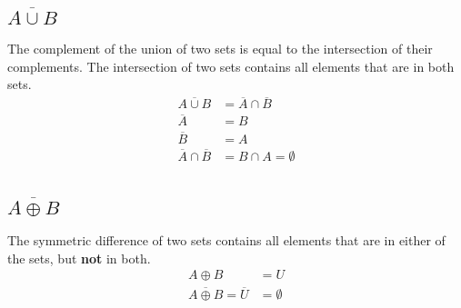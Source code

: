 \documentclass[a4paper,11pt]{scrartcl}
\begin{document}
\subsection{\(\overline{A \cup B}\)} The complement of the union of two sets is equal to the intersection of their complements. The intersection of two sets contains all elements that are in both sets.
\begin{align*}
  \overline{A \cup B} &= \overline{A} \cap \overline{B} \tag{De Morgan's First Law}\\
  \overline{A} &= B \\
  \overline{B} &= A \\
  \overline{A} \cap \overline{B} &= B \cap A = \emptyset \\
\end{align*}

\subsection{\(\overline{A \oplus B}\)} The symmetric difference of two sets contains all elements that are in either of the sets, but \textbf{not} in both.
\begin{align*}
  {A \oplus B} &= U\\
\overline{A \oplus B} = \overline{U} &= \emptyset \\
\end{align*}
\end{document}
